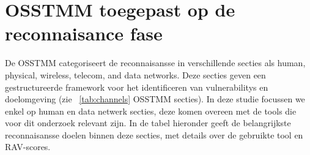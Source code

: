 






\section{OSSTMM toegepast op de reconnaisance fase}

De OSSTMM categoriseert de reconnaisansse in verschillende secties als human, physical, wireless, telecom, and data networks. Deze secties geven een gestructureerde framework voor het identificeren van vulnerabilitys en doelomgeving (zie ~\ref{tab:channels} OSSTMM secties).
In deze studie focussen we enkel op human en data netwerk secties, deze komen overeen met de tools die voor dit onderzoek relevant zijn.
In de tabel hieronder geeft de belangrijkste reconnaisansse doelen binnen deze secties, met details over de gebruikte tool en RAV-scores.

